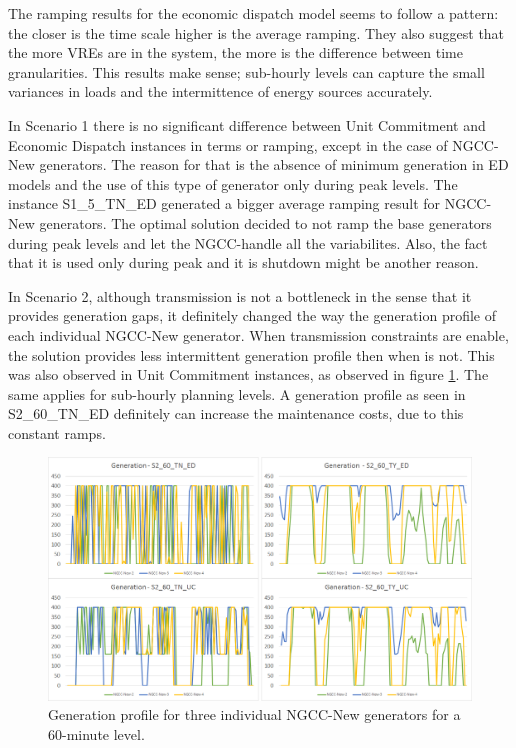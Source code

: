 \documentclass[12pt,LUDisStyle,twosided]{book}
\begin{document}
The ramping results for the economic dispatch model seems to follow a pattern: the closer is the time scale higher is the average ramping. They also suggest that the more VREs are in the system, the more is the difference between time granularities. This results make sense; sub-hourly levels can capture the small variances in loads and the intermittence of energy sources accurately. 

In Scenario 1 there is no significant difference between Unit Commitment and Economic Dispatch instances in terms or ramping, except in the case of NGCC-New generators. The reason for that is the absence of minimum generation in ED models and the use of this type of generator only during peak levels. The instance S1\_5\_TN\_ED generated a bigger average ramping result for NGCC-New generators. The optimal solution decided to not ramp the base generators during peak levels and let the NGCC-handle all the variabilites. Also, the fact that it is used only during peak and it is shutdown might be another reason.

In Scenario 2, although transmission is not a bottleneck in the sense that it provides generation gaps, it definitely changed the way the generation profile of each individual NGCC-New generator. When transmission constraints are enable, the solution provides less intermittent generation profile then when is not. This was also observed in Unit Commitment instances, as observed in figure    \ref{fig:generationProfileNGCC}. The same applies for sub-hourly planning levels. A generation profile as seen in S2\_60\_TN\_ED definitely can increase the maintenance costs, due to this constant ramps.

\begin{figure}[H] 
  \centering
  
	  \includegraphics[width=\textwidth,keepaspectratio]{generationProfileNGCC.png}
  
  \caption{Generation profile for three individual NGCC-New generators for a 60-minute level.}
  \label{fig:generationProfileNGCC}
  
\end{figure}
\end{document}
